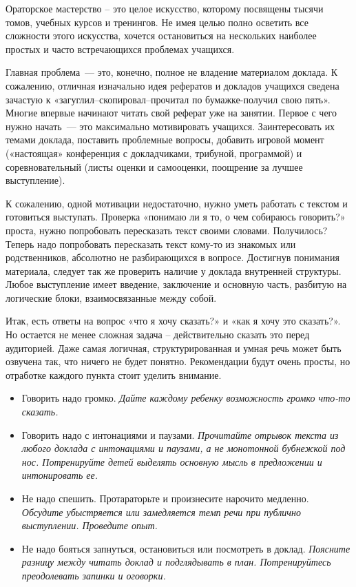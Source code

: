 Ораторское мастерство – это целое искусство, которому посвящены тысячи томов, учебных курсов и тренингов. Не имея целью полно осветить все сложности этого искусства, хочется остановиться на нескольких наиболее простых и часто встречающихся проблемах учащихся. 

Главная проблема~--- это, конечно, полное не владение материалом доклада. К сожалению, отличная изначально идея рефератов и докладов учащихся сведена зачастую к «загуглил--скопировал--прочитал по бумажке-получил свою пять». Многие впервые начинают читать свой реферат уже на занятии.
Первое с чего нужно начать~--- это максимально мотивировать учащихся. Заинтересовать их темами доклада, поставить проблемные вопросы, добавить игровой момент («настоящая» конференция с докладчиками, трибуной, программой) и соревновательный (листы оценки и самооценки, поощрение за лучшее выступление). 

К сожалению, одной мотивации недостаточно, нужно уметь работать с текстом и готовиться выступать. Проверка «понимаю ли я то, о чем собираюсь говорить?» проста, нужно попробовать пересказать текст своими словами. Получилось? Теперь надо попробовать пересказать текст кому-то из знакомых или родственников, абсолютно не разбирающихся в вопросе. Достигнув понимания материала, следует так же проверить наличие у доклада внутренней структуры. Любое выступление имеет введение, заключение и основную часть, разбитую на логические блоки, взаимосвязанные между собой.

Итак, есть ответы на вопрос «что я хочу сказать?» и «как я хочу это сказать?». Но остается не менее сложная задача – действительно сказать это перед аудиторией. Даже самая логичная, структурированная и умная речь может быть озвучена так, что ничего не будет понятно.  Рекомендации будут очень просты, но отработке каждого пункта стоит уделить внимание.
\begin{itemize}
	\item Говорить надо громко. {\slshape Дайте каждому ребенку возможность громко что-то сказать.}
	\item Говорить надо с интонациями и паузами. {\slshape Прочитайте отрывок текста из любого доклада с интонациями и паузами, а не монотонной бубнежкой под нос. Потренируйте детей выделять основную мысль в предложении и интонировать ее.}
	\item Не надо спешить. Протараторьте и произнесите нарочито медленно. {\slshape Обсудите убыстряется или замедляется темп речи при публично выступлении. Проведите опыт.}
	\item Не надо бояться запнуться, остановиться или посмотреть в доклад. {\slshape Поясните разницу между читать доклад и подглядывать в план. Потренируйтесь преодолевать запинки и оговорки.} 
\end{itemize}